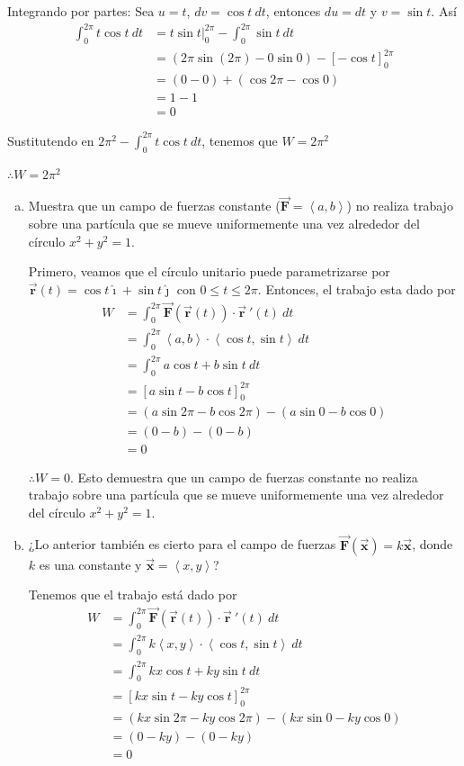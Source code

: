 \documentclass[12pt]{exam}
\newcommand{\iuni}{\pmb{\hat{\imath}}}
\newcommand{\juni}{\pmb{\hat{\jmath}}}
\newcommand{\vecb}[1]{\pmb{\vec{#1}}} %
\newcommand{\pvec}[1]{\left\langle #1 \right\rangle} %
\begin{document}
\begin{questions}
  Integrando por partes: Sea $u=t$, $dv=\cos{t}~dt$, entonces $du=dt$ y $v=\sin{t}$. Así
  \begin{align*}
    \int_0^{2\pi} t\cos{t}~dt
    &= t\sin{t}\Big|_0^{2\pi} - \int_0^{2\pi} \sin{t}~dt \\
    &= (2\pi\sin{(2\pi)}-0\sin{0})-\left[-\cos{t}\right]_0^{2\pi}\\
    &= (0-0) + (\cos{2\pi}-\cos{0})\\
    &= 1-1\\
    &=0
  \end{align*}

  Sustitutendo en $2\pi^2- \int_0^{2\pi} t\cos{t}~dt $, tenemos que $W= 2\pi^2$

  $\therefore W= 2\pi^2$

  \question{}
  \begin{enumerate}[a)]
  \item Muestra que un campo de fuerzas constante ($\vecb{F} = \pvec{a,b}$) no realiza trabajo sobre una
    partícula que se mueve uniformemente una vez alrededor del círculo $x^2+y^2=1$.

    Primero, veamos que el círculo unitario puede parametrizarse por $\vecb{r}(t) = \cos{t} \iuni + \sin{t} \juni$ con $0\leq t\leq 2\pi$.
    Entonces, el trabajo esta dado por
    \begin{align*}
      W
      &= \int_0^{2\pi} \vecb{F}(\vecb{r}(t)) \cdot \vecb{r}~'(t) ~dt\\
      &= \int_0^{2\pi} \pvec{a, b} \cdot \pvec{\cos{t}, \sin{t}} ~dt\\
      &= \int_0^{2\pi} a\cos{t} + b\sin{t} ~dt\\
      &= \left[a\sin{t} -b\cos{t} \right]_0^{2\pi}\\
      &= (a\sin{2\pi} -b\cos{2\pi}) - (a\sin{0} -b\cos{0})\\
      &= (0-b)-(0-b)\\
      &= 0
    \end{align*}

    $\therefore W= 0$. Esto demuestra que un campo de fuerzas constante no realiza trabajo sobre una partícula que se mueve uniformemente una vez alrededor del círculo $x^2+y^2=1$.

  \item ¿Lo anterior también es cierto para el campo de fuerzas $\vecb{F}(\vecb{x}) = k\vecb{x}$, donde $k$ es una constante y $\vecb{x}=\pvec{x,y}$?

    Tenemos que el trabajo está dado por
    \begin{align*}
      W
      &= \int_0^{2\pi} \vecb{F}(\vecb{r}(t)) \cdot \vecb{r}~'(t) ~dt\\
      &= \int_0^{2\pi} k\pvec{x,y} \cdot \pvec{\cos{t}, \sin{t}} ~dt\\
      &= \int_0^{2\pi} kx\cos{t} + ky\sin{t} ~dt\\
      &= \left[kx\sin{t} - ky\cos{t} \right]_0^{2\pi}\\
      &= (kx\sin{2\pi} - ky\cos{2\pi}) - (kx\sin{0} - ky\cos{0})\\
      &= (0-ky)-(0-ky)\\
      &= 0
    \end{align*}


\end{enumerate}
\end{questions}
\end{document}
